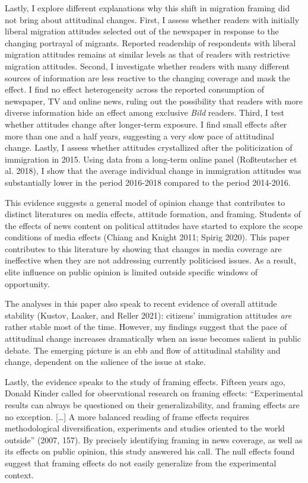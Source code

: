 \documentclass[
  12pt,
]{article}
\begin{document}
Lastly, I explore different explanations why this shift in migration framing did not bring about attitudinal changes. First, I assess whether readers with initially liberal migration attitudes selected out of the newspaper in response to the changing portrayal of migrants. Reported readership of respondents with liberal migration attitudes remains at similar levels as that of readers with restrictive migration attitudes. Second, I investigate whether readers with many different sources of information are less reactive to the changing coverage and mask the effect. I find no effect heterogeneity across the reported consumption of newspaper, TV and online news, ruling out the possibility that readers with more diverse information hide an effect among exclusive \emph{Bild} readers. Third, I test whether attitudes change after longer-term exposure. I find small effects after more than one and a half years, suggesting a very slow pace of attitudinal change. Lastly, I assess whether attitudes crystallized after the politicization of immigration in 2015. Using data from a long-term online panel (Roßteutscher et al. 2018), I show that the average individual change in immigration attitudes was substantially lower in the period 2016-2018 compared to the period 2014-2016.

This evidence suggests a general model of opinion change that contributes to distinct literatures on media effects, attitude formation, and framing. Students of the effects of news content on political attitudes have started to explore the scope conditions of media effects (Chiang and Knight 2011; Spirig 2020). This paper contributes to this literature by showing that changes in media coverage are ineffective when they are not addressing currently politicised issues. As a result, elite influence on public opinion is limited outside specific windows of opportunity.

The analyses in this paper also speak to recent evidence of overall attitude stability (Kustov, Laaker, and Reller 2021): citizens' immigration attitudes \emph{are} rather stable most of the time. However, my findings suggest that the pace of attitudinal change increases dramatically when an issue becomes salient in public debate. The emerging picture is an ebb and flow of attitudinal stability and change, dependent on the salience of the issue at stake.

Lastly, the evidence speaks to the study of framing effects. Fifteen years ago, Donald Kinder called for observational research on framing effects: ``Experimental results can always be questioned on their generalizability, and framing effects are no exception. {[}\ldots{]} A more balanced reading of frame effects requires methodological diversification, experiments and studies oriented to the world outside'' (2007, 157). By precisely identifying framing in news coverage, as well as its effects on public opinion, this study answered his call. The null effects found suggest that framing effects do not easily generalize from the experimental context.
\end{document}
